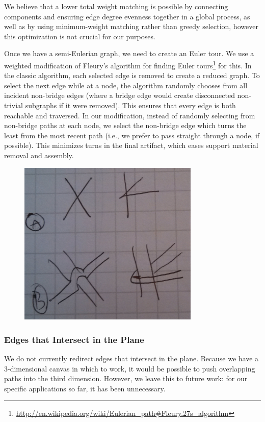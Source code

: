 We believe that a lower total weight matching is possible by connecting components and ensuring edge degree evenness together in a global process, as well as by using minimum-weight matching rather than greedy selection, however this optimization is not crucial for our purposes.

Once we have a semi-Eulerian graph, we need to create an Euler tour.  We use a weighted modification of Fleury's algorithm for finding Euler tours\footnote{\url{http://en.wikipedia.org/wiki/Eulerian_path\#Fleury.27s_algorithm}} for this.  In the classic algorithm, each selected edge is removed to create a reduced graph.  To select the next edge while at a node, the algorithm randomly chooses from all incident non-bridge edges (where a bridge edge would create disconnected non-trivial subgraphs if it were removed).  This ensures that every edge is both reachable and traversed.  In our modification, instead of randomly selecting from non-bridge paths at each node, we select the non-bridge edge which turns the least from the most recent path (i.e., we prefer to pass straight through a node, if possible).  This minimizes turns in the final artifact, which eases support material removal and assembly.

\begin{figure}[h!]
\centering
    \includegraphics[width=3.4in]{figures/placeholder/templates.jpg}
\caption{}
\label{fig:templates}
\end{figure}

\subsubsection{Edges that Intersect in the Plane}
We do not currently redirect edges that intersect in the plane.  Because we have a 3-dimensional canvas in which to work, it would be possible to push overlapping paths into the third dimension.  However, we leave this to future work: for our specific applications so far, it has been unnecessary.


